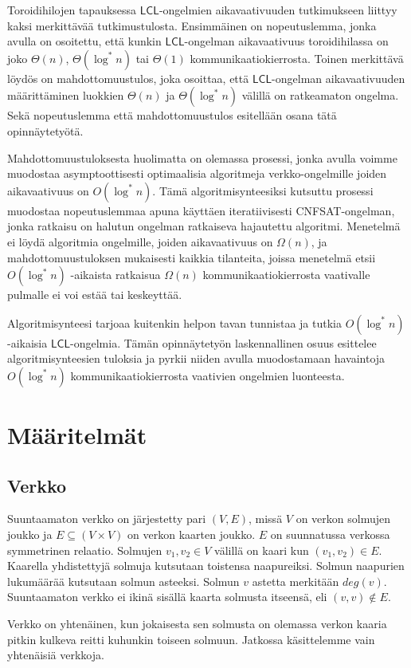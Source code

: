 \documentclass[12pt,finnish]{tktltiki2}
\theoremstyle{definition}
\theoremstyle{remark}
\newcommand*{\lcl}{\ensuremath{\mathsf{LCL}}}
\begin{document}
Toroidihilojen tapauksessa \lcl -ongelmien aikavaativuuden tutkimukseen liittyy kaksi merkittävää tutkimustulosta. Ensimmäinen on nopeutuslemma, jonka avulla on osoitettu, että kunkin \lcl -ongelman aikavaativuus toroidihilassa on joko $\Theta(n)$, $\Theta(\log^* n)$ tai $\Theta(1)$ kommunikaatiokierrosta. Toinen merkittävä löydös on mahdottomuustulos, joka osoittaa, että \lcl -ongelman aikavaativuuden määrittäminen luokkien $\Theta(n)$ ja $\Theta(\log^* n)$ välillä on ratkeamaton ongelma. Sekä nopeutuslemma että mahdottomuustulos esitellään osana tätä opinnäytetyötä.

Mahdottomuustuloksesta huolimatta on olemassa prosessi, jonka avulla voimme muodostaa asymptoottisesti optimaalisia algoritmeja verkko-ongelmille joiden aikavaativuus on $O(\log^* n)$. Tämä algoritmisynteesiksi kutsuttu prosessi muodostaa nopeutuslemmaa apuna käyttäen iteratiivisesti CNFSAT-ongelman, jonka ratkaisu on halutun ongelman ratkaiseva hajautettu algoritmi. Menetelmä ei löydä algoritmia ongelmille, joiden aikavaativuus on $\Omega(n)$, ja mahdottomuustuloksen mukaisesti kaikkia tilanteita, joissa menetelmä etsii $O(\log^* n)$ -aikaista ratkaisua $\Omega(n)$ kommunikaatiokierrosta vaativalle pulmalle ei voi estää tai keskeyttää.

Algoritmisynteesi tarjoaa kuitenkin helpon tavan tunnistaa ja tutkia $O(\log^* n)$-aikaisia \lcl -ongelmia. Tämän opinnäytetyön laskennallinen osuus esittelee algoritmisynteesien tuloksia ja pyrkii niiden avulla muodostamaan havaintoja $O(\log^* n)$ kommunikaatiokierrosta vaativien ongelmien luonteesta.

\section{Määritelmät}
\subsection{Verkko}

Suuntaamaton verkko on järjestetty pari $(V, E)$, missä $V$ on verkon solmujen joukko ja $E \subseteq (V \times V)$ on verkon kaarten joukko. $E$ on suunnatussa verkossa symmetrinen relaatio. Solmujen $v_1, v_2 \in V$ välillä on kaari kun $(v_1, v_2) \in E$. Kaarella yhdistettyjä solmuja kutsutaan toistensa naapureiksi. Solmun naapurien lukumäärää kutsutaan solmun asteeksi. Solmun $v$ astetta merkitään $deg(v)$. Suuntaamaton verkko ei ikinä sisällä kaarta solmusta itseensä, eli $(v, v) \notin E$.

Verkko on yhtenäinen, kun jokaisesta sen solmusta on olemassa verkon kaaria pitkin kulkeva reitti kuhunkin toiseen solmuun. Jatkossa käsittelemme vain yhtenäisiä verkkoja.
\end{document}
